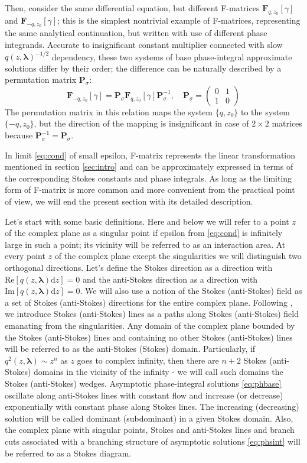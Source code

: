 \documentclass[atmp]{ipart_v1}
\def\rmd{\mathrm{d}}
\def\lmbd{\bm{\lambda}}
\def\P{\bm{P}_\sigma}
\def\F{\bm{F}}
\def\Re{\mathrm{Re}}
\def\Im{\mathrm{Im}}
\newcommand\eref[1]{\eqref{#1}}
\newcommand\sref[1]{section \ref{#1}}
\newcommand\phsintgrnd[1][z]{q(#1,\lmbd)}
\newcommand\predexp[1][z]{q(#1,\lmbd)^{-1/2}}
\begin{document}
Then, consider the same differential equation, but different F-matrices $\F_{q,z_0}[\gamma]$ and $\F_{-q,z_0}[\gamma]$;
this is the simplest nontrivial example of F-matrices, representing the same analytical continuation, but written
with use of different phase integrands. Accurate to insignificant constant multiplier connected with slow
$\predexp$ dependency, these two systems of base phase-integral approximate solutions differ by their order;
the difference can be naturally described by a permutation matrix $\P$:
\begin{equation}
\F_{-q,z_0}[\gamma] = \P\F_{q,z_0}[\gamma]\P^{-1}, \quad
\P =
\left(\begin{array}{*{2}{c}}
0 & 1 \\ 1 & 0 
\end{array}\right) 
\label{eq:qchange} 
\end{equation}
The permutation matrix in this relation maps the system $\{q,z_0\}$ to the system $\{-q,z_0\}$, but the direction
of the mapping is insignificant in case of $2 \times 2$ matrices because $\P^{-1} = \P$. 

In limit \eref{eq:cond} of small epsilon, F-matrix represents the linear transformation
mentioned in \sref{sec:intro} and can be approximately expressed in terms of the corresponding
Stokes constants and phase integrals. As long as the limiting form of F-matrix is more common
and more convenient from the practical point of view, we will end the present section with 
its detailed description.

Let's start with some basic definitions. Here and below we will refer to a point $z$ of the complex
plane as a singular point if epsilon from \eref{eq:cond} is infinitely large in such a point; its
vicinity will be referred to as an interaction area. 
At every point $z$ of the complex plane except the singularities we will distinguish two 
orthogonal directions. Let's define the Stokes direction 
as a direction with $\Re \left[ \phsintgrnd \rmd z \right]=0$ and the anti-Stokes direction 
as a direction with $\Im \left[ \phsintgrnd \rmd z \right]=0$. We will also use a notion of 
the Stokes (anti-Stokes) field as a set of Stokes (anti-Stokes) directions for the entire 
complex plane. Following \cite{heading, rwbook}, we introduce Stokes (anti-Stokes) lines as a 
paths along Stokes (anti-Stokes) field emanating from the singularities. 
Any domain of the complex plane bounded by the Stokes (anti-Stokes) lines and containing no other 
Stokes (anti-Stokes) lines will be referred to as the anti-Stokes (Stokes) domain. Particularly, if 
$q^2(z,\lmbd) \sim z^n$ as $z$ goes to complex infinity, then there are $n+2$ Stokes 
(anti-Stokes) domains in the vicinity of the infinity - we will call such domains the Stokes 
(anti-Stokes) wedges. Asymptotic phase-integral solutions \eref{eq:phbase} oscillate along anti-Stokes 
lines with constant flow and increase (or decrease) exponentially with constant phase along Stokes lines. 
The increasing (decreasing) solution will be called dominant (subdominant) in a given Stokes domain. 
Also, the complex plane with singular points, Stokes and anti-Stokes lines and branch cuts associated 
with a branching structure of asymptotic solutions \eref{eq:phsint} will be referred to as a Stokes diagram.
\end{document}
